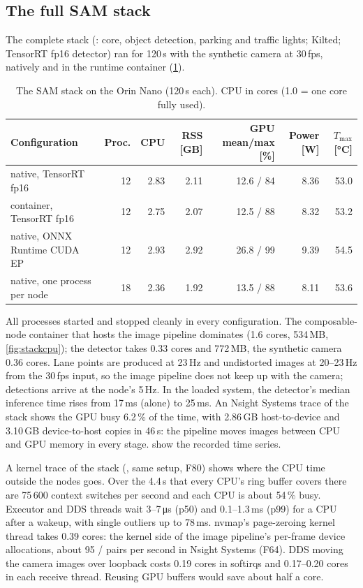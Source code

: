 \documentclass[11pt,a4paper]{article}
\newcommand{\finding}[1]{\textsf{\small F#1}}
\begin{document}
\subsection{The full SAM stack}\label{sec:stack}
The complete stack (: core, object detection, parking and traffic lights; Kilted;
TensorRT fp16 detector) ran for 120\,s with the synthetic camera at 30\,fps, natively and in the runtime container
(\cref{tab:stack}).

\begin{table}[H]
\centering\small
\caption{The SAM stack on the Orin Nano (120\,s each). CPU in cores (1.0 = one core fully used).}\label{tab:stack}
\setlength{\tabcolsep}{3.5pt}
\begin{tabular}{@{}lrrrrrr@{}}
\toprule
Configuration & Proc. & CPU & RSS [GB] & GPU mean/max [\%] & Power [W] & $T_{\max}$ [\si{\celsius}] \\
\midrule
native, TensorRT fp16 & 12 & 2.83 & 2.11 & 12.6 / 84 & 8.36 & 53.0 \\
container, TensorRT fp16 & 12 & 2.75 & 2.07 & 12.5 / 88 & 8.32 & 53.2 \\
native, ONNX Runtime CUDA EP & 12 & 2.93 & 2.92 & 26.8 / 99 & 9.39 & 54.5 \\
native, one process per node & 18 & 2.36 & 1.92 & 13.5 / 88 & 8.11 & 53.6 \\
\bottomrule
\end{tabular}
\end{table}

All processes started and stopped cleanly in every configuration. The composable-node container that hosts the image
pipeline dominates (1.6 cores, 534\,MB, \cref{fig:stackcpu}); the detector takes 0.33 cores and 772\,MB, the synthetic
camera 0.36 cores. Lane points are produced at 23\,Hz and undistorted images at 20--23\,Hz from the 30\,fps input, so the
image pipeline does not keep up with the camera; detections arrive at the node's 5\,Hz. In the loaded system, the
detector's median inference time rises from 17\,ms (alone) to 25\,ms. An Nsight Systems trace of the stack shows the GPU
busy 6.2\,\% of the time, with 2.86\,GB host-to-device and 3.10\,GB device-to-host copies in 46\,s: the pipeline moves
images between CPU and GPU memory in every stage.  show the recorded time series.

A kernel trace of the stack (, same setup, \finding{80}) shows where the CPU time outside the nodes
goes. Over the 4.4\,s that every CPU's ring buffer covers there are 75\,600 context switches per second and each CPU is
about 54\,\% busy. Executor and DDS threads wait 3--7\,\si{\micro\second} (p50) and 0.1--1.3\,ms (p99) for a CPU after a wakeup,
with single outliers up to 78\,ms. nvmap's page-zeroing kernel thread  takes 0.39 cores: the kernel side
of the image pipeline's per-frame device allocations, about 95 / pairs per second in
Nsight Systems (\finding{64}). DDS moving the camera images over loopback costs 0.19 cores in  softirqs and
0.17--0.20 cores in each receive thread. Reusing GPU buffers would save about half a core.
\end{document}
